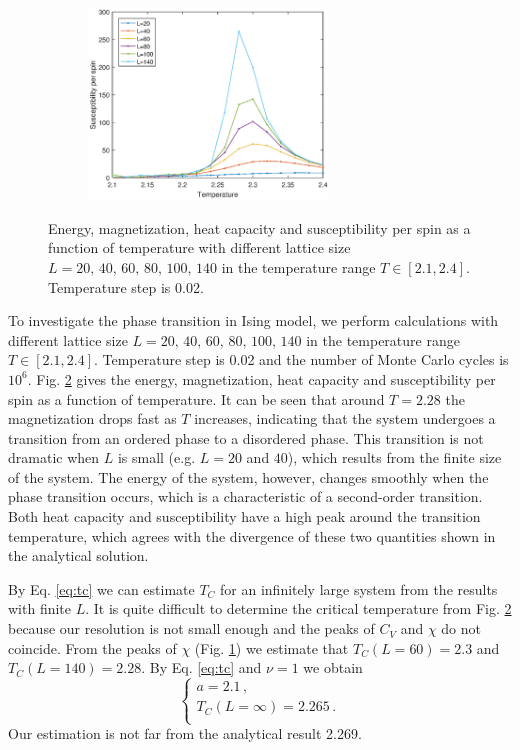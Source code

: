 \begin{figure}[tb]
\begin{subfigure}[tb]{0.5\textwidth}
		\caption{}
	\end{subfigure}
	~
	\begin{subfigure}[tb]{0.5\textwidth}
		\centering
		\includegraphics[width=0.7\textwidth]{Tran_sus.eps}		
		\caption{}
		\label{fig:transition_sus}
	\end{subfigure}
	\caption{Energy, magnetization, heat capacity and susceptibility per spin as a function of temperature
	with different lattice size $L=20,\,40,\,60,\,80,\,100,\,140$ in the temperature range $T\in[2.1,2.4]$. 
	Temperature step is 0.02. }
	\label{fig:transition}
\end{figure}
To investigate the phase transition in Ising model, we perform calculations with different lattice size 
$L=20,\,40,\,60,\,80,\,100,\,140$ in the temperature range $T\in[2.1,2.4]$. 
Temperature step is 0.02 and the number of Monte Carlo cycles is $10^6$. 
Fig. \ref{fig:transition} gives the energy, magnetization, heat capacity and susceptibility per spin as a function of temperature. 
It can be seen that around $T=2.28$ the magnetization drops fast as $T$ increases, 
indicating that the system undergoes a transition from an ordered phase to a disordered phase. 
This transition is not dramatic when $L$ is small (e.g. $L=20$ and $40$), which results from the finite size of the system. 
The energy of the system, however, changes smoothly when the phase transition occurs, 
which is a characteristic of a second-order transition. 
Both heat capacity and susceptibility have a high peak around the transition temperature, 
which agrees with the divergence of these two quantities shown in the analytical solution. 
\par
By Eq. \ref{eq:tc} we can estimate $T_C$ for an infinitely large system from the results with finite $L$. 
It is quite difficult to determine the critical temperature from Fig. \ref{fig:transition} 
because our resolution is not small enough and the peaks of $C_V$ and $\chi$ do not coincide. 
From the peaks of $\chi$ (Fig. \ref{fig:transition_sus}) we estimate that $T_C(L=60)=2.3$ and $T_C(L=140)=2.28$. 
By Eq. \ref{eq:tc} and $\nu=1$ we obtain 
\begin{equation}
\left\{
\begin{array}{c}
a=2.1\,,  \\
T_C(L=\infty)=2.265\,.  \\
\end{array}
\right.
\end{equation}
Our estimation is not far from the analytical result 2.269. 